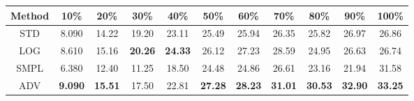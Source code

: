 \documentclass{standalone}
\begin{document}
\begin{tabular}{c|cccccccccc}
      \toprule
      Method & 10\% & 20\% & 30\% & 40\% & 50\% & 60\% & 70\% & 80\% & 90\% & 100\% \\
      \midrule
STD & 8.090 & 14.22 & 19.20 & 23.11 & 25.49 & 25.94 & 26.35 & 25.82 & 26.97 & 26.86\\
LOG & 8.610 & 15.16 & \textbf{20.26} & \textbf{24.33} & 26.12 & 27.23 & 28.59 & 24.95 & 26.63 & 26.74\\
SMPL & 6.380 & 12.40 & 11.25 & 18.50 & 24.48 & 24.86 & 26.61 & 23.16 & 21.94 & 31.58\\
ADV & \textbf{9.090} & \textbf{15.51} & 17.50 & 22.81 & \textbf{27.28} & \textbf{28.23} & \textbf{31.01} & \textbf{30.53} & \textbf{32.90} & \textbf{33.25}\\
  \bottomrule
\end{tabular}
\end{document}
